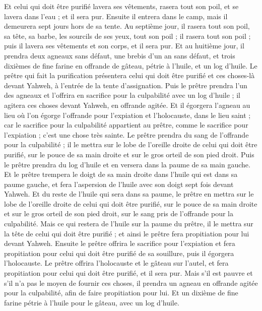 \begin{multicols}{2}
Et celui qui doit être purifié lavera ses vêtements, rasera tout son poil, et se lavera dans l'eau ; et il sera pur. Ensuite il entrera dans le camp, mais il demeurera sept jours hors de sa tente.
Au septième jour, il rasera tout son poil, sa tête, sa barbe, les sourcils de ses yeux, tout son poil ; il rasera tout son poil ; puis il lavera ses vêtements et son corps, et il sera pur.
Et au huitième jour, il prendra deux agneaux sans défaut, une brebis d'un an sans défaut, et trois dixièmes de fine farine en offrande de gâteau, pétrie à l'huile, et un log d'huile.
Le prêtre qui fait la purification présentera celui qui doit être purifié et ces choses-là devant Yahweh, à l'entrée de la tente d'assignation.
Puis le prêtre prendra l'un des agneaux et l'offrira en sacrifice pour la culpabilité avec un log d'huile ; il agitera ces choses devant Yahweh, en offrande agitée.
Et il égorgera l'agneau au lieu où l'on égorge l'offrande pour l'expiation et l'holocauste, dans le lieu saint ; car le sacrifice pour la culpabilité appartient au prêtre, comme le sacrifice pour l'expiation ; c'est une chose très sainte.
Le prêtre prendra du sang de l'offrande pour la culpabilité ; il le mettra sur le lobe de l'oreille droite de celui qui doit être purifié, sur le pouce de sa main droite et sur le gros orteil de son pied droit.
Puis le prêtre prendra du log d'huile et en versera dans la paume de sa main gauche.
Et le prêtre trempera le doigt de sa main droite dans l'huile qui est dans sa paume gauche, et fera l'aspersion de l'huile avec son doigt sept fois devant Yahweh.
Et du reste de l'huile qui sera dans sa paume, le prêtre en mettra sur le lobe de l'oreille droite de celui qui doit être purifié, sur le pouce de sa main droite et sur le gros orteil de son pied droit, sur le sang pris de l'offrande pour la culpabilité.
Mais ce qui restera de l'huile sur la paume du prêtre, il le mettra sur la tête de celui qui doit être purifié ; et ainsi le prêtre fera propitiation pour lui devant Yahweh.
Ensuite le prêtre offrira le sacrifice pour l'expiation et fera propitiation pour celui qui doit être purifié de sa souillure, puis il égorgera l'holocauste.
Le prêtre offrira l'holocauste et le gâteau sur l'autel, et fera propitiation pour celui qui doit être purifié, et il sera pur.
Mais s'il est pauvre et s'il n'a pas le moyen de fournir ces choses, il prendra un agneau en offrande agitée pour la culpabilité, afin de faire propitiation pour lui. Et un dixième de fine farine pétrie à l'huile pour le gâteau, avec un log d'huile.

\end{multicols}
